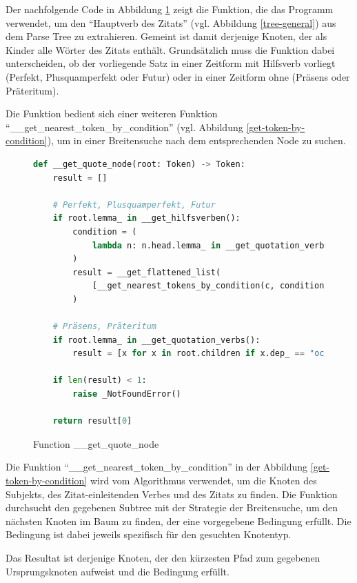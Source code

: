 Der nachfolgende Code in Abbildung \ref{get-quotation-node} zeigt die Funktion, die das Programm verwendet,
um den \enquote{Hauptverb des Zitats} (vgl. Abbildung \ref{tree-general})
aus dem Parse Tree zu extrahieren. Gemeint ist damit derjenige Knoten, der als Kinder alle Wörter 
des Zitats enthält. Grundsätzlich muss die Funktion dabei unterscheiden, ob der vorliegende Satz 
in einer Zeitform mit Hilfsverb vorliegt (Perfekt, Plusquamperfekt oder Futur) oder in einer 
Zeitform ohne (Präsens oder Präteritum).

Die Funktion bedient sich einer weiteren Funktion \enquote{\_\_get\_nearest\_token\_by\_condition}
(vgl. Abbildung \ref{get-token-by-condition}), um in einer Breitensuche nach dem entsprechenden Node zu suchen.

\begin{figure}[H]
    \begin{lstlisting}[language=Python]
def __get_quote_node(root: Token) -> Token:
    result = []

    # Perfekt, Plusquamperfekt, Futur
    if root.lemma_ in __get_hilfsverben():
        condition = (
            lambda n: n.head.lemma_ in __get_quotation_verbs() and n.dep_ == "oc"
        )
        result = __get_flattened_list(
            [__get_nearest_tokens_by_condition(c, condition) for c in root.children]
        )

    # Präsens, Präteritum
    if root.lemma_ in __get_quotation_verbs():
        result = [x for x in root.children if x.dep_ == "oc"]

    if len(result) < 1:
        raise _NotFoundError()

    return result[0]
    \end{lstlisting}
    \caption{Function \_\_get\_quote\_node}
    \label{get-quotation-node}
\end{figure}

Die Funktion \enquote{\_\_get\_nearest\_token\_by\_condition} in der Abbildung \ref{get-token-by-condition} wird vom Algorithmus verwendet,
um die Knoten des Subjekts, des Zitat-einleitenden Verbes und des Zitats zu finden. Die Funktion
durchsucht den gegebenen Subtree mit der Strategie der Breitensuche, um den nächsten Knoten im Baum zu finden,
der eine vorgegebene Bedingung erfüllt. Die Bedingung ist dabei jeweils spezifisch für den gesuchten Knotentyp.

Das Resultat ist derjenige Knoten, der den kürzesten Pfad zum gegebenen Ursprungsknoten aufweist und die Bedingung erfüllt.

